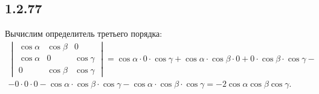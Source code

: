 \subsection{1.2.77}

Вычислим определитель третьего порядка:
\begin{multline*}
\begin{vmatrix}
	\cos\alpha & \cos\beta & 0 \\
	\cos\alpha & 0 & \cos\gamma \\
	0 & \cos\beta & \cos\gamma
\end{vmatrix}
=\cos\alpha\cdot0\cdot\cos\gamma+\cos\alpha\cdot\cos\beta\cdot0+0\cdot\cos\beta\cdot\cos\gamma- \\
-0\cdot0\cdot0-\cos\alpha\cdot\cos\beta\cdot\cos\gamma-\cos\alpha\cdot\cos\beta\cdot\cos\gamma=-2\cos\alpha\cos\beta\cos\gamma.
\end{multline*}